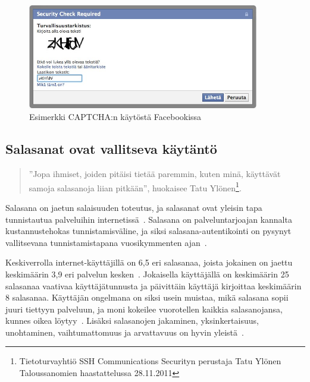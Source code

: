 \documentclass[finnish,gradu]{tktltiki}
\begin{document}
  \begin{figure}
    \centering
    \includegraphics[width=0.9\textwidth]{images/Facebook_captcha_filled.jpg}
    \caption{Esimerkki CAPTCHA:n käytöstä Facebookissa}
    \label{fig:captcha_facebook}
  \end{figure}



  \subsection{Salasanat ovat vallitseva käytäntö} %
  \label{sub:salasanat}

  \begin{quote}
    ''Jopa ihmiset, joiden pitäisi tietää paremmin, kuten minä, käyttävät samoja salasanoja liian pitkään'', huokaisee Tatu Ylönen\footnote{Tietoturvayhtiö SSH Communications Securityn perustaja Tatu Ylönen Taloussanomien haastattelussa 28.11.2011}.
  \end{quote}

  Salasana on jaetun salaisuuden toteutus, ja salasanat ovat yleisin tapa tunnistautua palveluihin internetissä~\cite{study_of_passwords_07, passpet_06, password_management_strategies_06, pwdhash_extension_05}. Salasana on palveluntarjoajan kannalta kustannustehokas tunnistamisväline, ja siksi salasana-autentikointi on pysynyt vallitsevana tunnistamistapana vuosikymmenten ajan~\cite{pw_auth_system_perspective_08}.

  Keskiverrolla internet-käyttäjillä on 6,5 eri salasanaa, joista jokainen on jaettu keskimäärin 3,9 eri palvelun kesken~\cite{study_of_passwords_07}. Jokaisella käyttäjällä on keskimäärin 25 salasanaa vaativaa käyttäjätunnusta ja päivittäin käyttäjä kirjoittaa keskimäärin 8 salasanaa. Käyttäjän ongelmana on siksi usein muistaa, mikä salasana sopii juuri tiettyyn palveluun, ja moni kokeilee vuorotellen kaikkia salasanojansa, kunnes oikea löytyy~\cite{study_of_passwords_07}. Lisäksi salasanojen jakaminen, yksinkertaisuus, unohtaminen, vaihtumattomuus ja arvattavuus on hyvin yleistä~\cite{password_management_strategies_06, pw_auth_system_perspective_08, passpet_06}.
\end{document}
